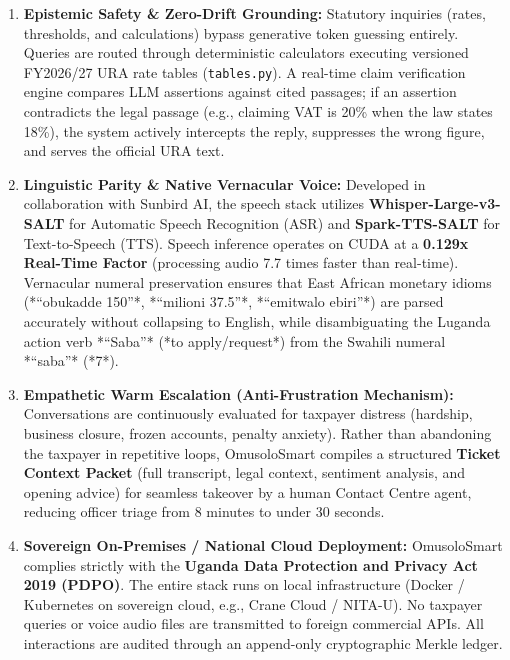 \documentclass[10pt,a4paper]{article}
\begin{document}
\begin{enumerate}
  \item \textbf{Epistemic Safety \& Zero-Drift Grounding:}
  Statutory inquiries (rates, thresholds, and calculations) bypass generative token guessing entirely. Queries are routed through deterministic calculators executing versioned FY2026/27 URA rate tables (\texttt{tables.py}). A real-time claim verification engine compares LLM assertions against cited passages; if an assertion contradicts the legal passage (e.g., claiming VAT is 20\% when the law states 18\%), the system actively intercepts the reply, suppresses the wrong figure, and serves the official URA text.
  
  \item \textbf{Linguistic Parity \& Native Vernacular Voice:}
  Developed in collaboration with Sunbird AI, the speech stack utilizes \textbf{Whisper-Large-v3-SALT} for Automatic Speech Recognition (ASR) and \textbf{Spark-TTS-SALT} for Text-to-Speech (TTS). Speech inference operates on CUDA at a \textbf{0.129x Real-Time Factor} (processing audio 7.7 times faster than real-time). Vernacular numeral preservation ensures that East African monetary idioms (*``obukadde 150''*, *``milioni 37.5''*, *``emitwalo ebiri''*) are parsed accurately without collapsing to English, while disambiguating the Luganda action verb *``Saba''* (*to apply/request*) from the Swahili numeral *``saba''* (*7*).

  \item \textbf{Empathetic Warm Escalation (Anti-Frustration Mechanism):}
  Conversations are continuously evaluated for taxpayer distress (hardship, business closure, frozen accounts, penalty anxiety). Rather than abandoning the taxpayer in repetitive loops, OmusoloSmart compiles a structured \textbf{Ticket Context Packet} (full transcript, legal context, sentiment analysis, and opening advice) for seamless takeover by a human Contact Centre agent, reducing officer triage from 8 minutes to under 30 seconds.

  \item \textbf{Sovereign On-Premises / National Cloud Deployment:}
  OmusoloSmart complies strictly with the \textbf{Uganda Data Protection and Privacy Act 2019 (PDPO)}. The entire stack runs on local infrastructure (Docker / Kubernetes on sovereign cloud, e.g., Crane Cloud / NITA-U). No taxpayer queries or voice audio files are transmitted to foreign commercial APIs. All interactions are audited through an append-only cryptographic Merkle ledger.
\end{enumerate}
\end{document}
